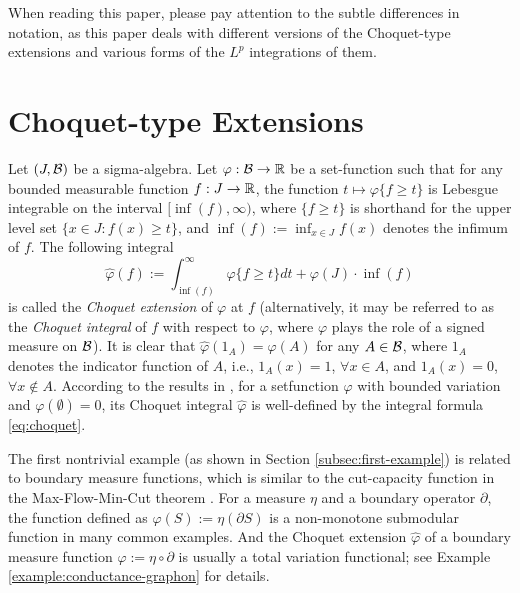 \documentclass[12pt,a4paper]{article}
\begin{document}
When reading this paper, please pay attention to the subtle differences in notation, as this paper deals with different versions of the Choquet-type extensions and various forms of the $L^p$ integrations of them. 

\section{Choquet-type Extensions%
}\label{sec:disjoint-pair-extension}



{\normalsize Let $(J,\mathcal{B})$ be  a sigma-algebra. Let $\varphi:\mathcal{B}\to \mathbb{R}$ be a set-function such that for any bounded measurable function $f:J\to\mathbb{R}$, the function $t\mapsto \varphi\{f\ge t\}$ is Lebesgue integrable on the interval $[\inf (f),\infty)$, where $\{f\ge t\}$  is shorthand for the upper  level set $\{x\in J:f(x)\ge t\}$, and $\inf (f):=\inf_{x\in J}f(x)$ denotes the infimum of $f$. 
The following integral 
\begin{equation}\label{eq:choquet}
\widehat{\varphi}(f):=\int_{\inf (f)}^\infty \varphi\{f\ge t\}dt+\varphi(J)\cdot\inf (f)    
\end{equation}
\noindent is called the \emph{Choquet extension} of $\varphi$ at $f$ (alternatively, it may be referred to as the \emph{Choquet integral} of $f$ with respect to $\varphi$, where $\varphi$ plays the role of a signed measure on $\mathcal{B}$). 
It is clear that $\widehat{\varphi}(1_A)=\varphi(A)$ for any $A\in\mathcal{B}$, where $1_A$ denotes the indicator function of $A$, i.e., $1_A(x)=1$, $\forall x\in A$, and $1_A(x)=0$, $\forall x\not\in A$. 
According to the results in \cite{Lovasz23,Lovasz25}, for a setfunction $\varphi$ with bounded variation and $\varphi(\emptyset)=0$,  its Choquet integral $\widehat{\varphi}$ is well-defined by the integral formula \eqref{eq:choquet}.} 

The first nontrivial example (as shown in Section \ref{subsec:first-example}) is related to boundary measure functions, which is similar to the cut-capacity function in the Max-Flow-Min-Cut theorem \cite{Lovasz21}. For a measure $\eta$ and a boundary operator $\partial$, the function defined as $\varphi(S):=\eta(\partial S)$ is a non-monotone submodular function in many common examples. And the Choquet extension $\widehat{\varphi}$ of a boundary measure function $\varphi:=\eta\circ \partial$ is usually a total variation functional; see Example %
\ref{example:conductance-graphon} for details. 
\end{document}
